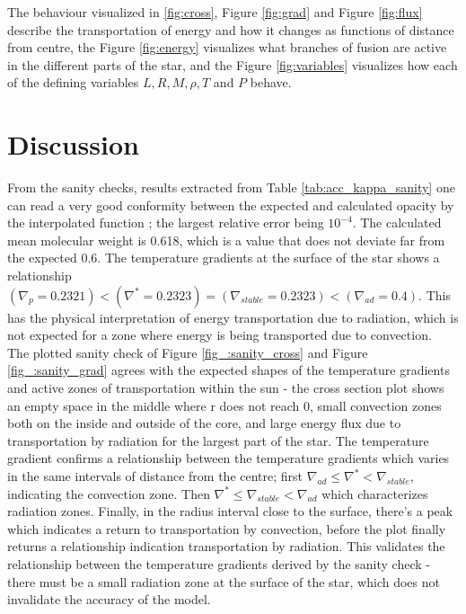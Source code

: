 \documentclass[10pt, nofootinbib, twocolumn]{revtex4-1}
\begin{document}
\newpage
The behaviour visualized in \ref{fig:cross}, Figure \ref{fig:grad} and Figure \ref{fig:flux} describe the transportation of energy and how it changes as functions of distance from centre, the Figure \ref{fig:energy} visualizes what branches of fusion are active in the different parts of the star, and the Figure \ref{fig:variables} visualizes how each of the defining variables $L, R, M, \rho, T$ and $P$ behave. 


\section{Discussion}
From the sanity checks, results extracted from Table \ref{tab:acc_kappa_sanity} one can read a very good conformity between the expected and calculated opacity by the interpolated function ; the largest relative error being $10^{-4}$. The calculated mean molecular weight is 0.618, which is a value that does not deviate far from the expected 0.6. The temperature gradients at the surface of the star shows a relationship $(\nabla_{p}= 0.2321) < (\nabla^*=0.2323) = (\nabla_{stable}=0.2323) < (\nabla_{ad} = 0.4)$. This has the physical interpretation of energy transportation due to radiation, which is not expected for a zone where energy is being transported due to convection. \\

The plotted sanity check of Figure \ref{fig_:sanity_cross} and Figure \ref{fig_:sanity_grad} agrees with the expected shapes of the temperature gradients and active zones of transportation within the sun - the cross section plot shows an empty space in the middle where r does not reach 0, small convection zones both on the inside and outside of the core, and large energy flux due to transportation by radiation for the largest part of the star. The temperature gradient confirms a relationship between the temperature gradients which varies in the same intervals of distance from the centre; first $\nabla_{ad}\leq\nabla^*<\nabla_{stable}$, indicating the convection zone. Then $\nabla^*\leq\nabla_{stable}<\nabla_{ad}$ which characterizes radiation zones. Finally, in the radius interval close to the surface, there's a peak which indicates a return to transportation by convection, before the plot finally returns a relationship indication transportation by radiation. This validates the relationship between the temperature gradients derived by the sanity check - there must be a small radiation zone at the surface of the star, which does not invalidate the accuracy of the model.  \\
\end{document}
